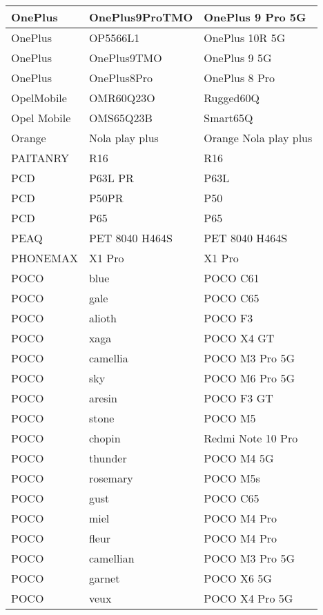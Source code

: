 \begin{tabularx}{\linewidth}{|l|X|X|}
        OnePlus & OnePlus9ProTMO & OnePlus 9 Pro 5G \\ \hline
        OnePlus & OP5566L1 & OnePlus 10R 5G \\ \hline
        OnePlus & OnePlus9TMO & OnePlus 9 5G \\ \hline
        OnePlus & OnePlus8Pro & OnePlus 8 Pro \\ \hline
        OpelMobile & OMR60Q23O & Rugged60Q \\ \hline
        Opel Mobile & OMS65Q23B & Smart65Q \\ \hline
        Orange & Nola play plus & Orange Nola play plus \\ \hline
        PAITANRY & R16 & R16 \\ \hline
        PCD & P63L PR & P63L \\ \hline
        PCD & P50PR & P50 \\ \hline
        PCD & P65 & P65 \\ \hline
        PEAQ & PET 8040 H464S & PET 8040 H464S \\ \hline
        PHONEMAX & X1 Pro & X1 Pro \\ \hline
        POCO & blue & POCO C61 \\ \hline
        POCO & gale & POCO C65 \\ \hline
        POCO & alioth & POCO F3 \\ \hline
        POCO & xaga & POCO X4 GT \\ \hline
        POCO & camellia & POCO M3 Pro 5G \\ \hline
        POCO & sky & POCO M6 Pro 5G \\ \hline
        POCO & aresin & POCO F3 GT \\ \hline
        POCO & stone & POCO M5 \\ \hline
        POCO & chopin & Redmi Note 10 Pro \\ \hline
        POCO & thunder & POCO M4 5G \\ \hline
        POCO & rosemary & POCO M5s \\ \hline
        POCO & gust & POCO C65 \\ \hline
        POCO & miel & POCO M4 Pro \\ \hline
        POCO & fleur & POCO M4 Pro \\ \hline
        POCO & camellian & POCO M3 Pro 5G \\ \hline
        POCO & garnet & POCO X6 5G \\ \hline
        POCO & veux & POCO X4 Pro 5G \\ \hline

\end{tabularx}

